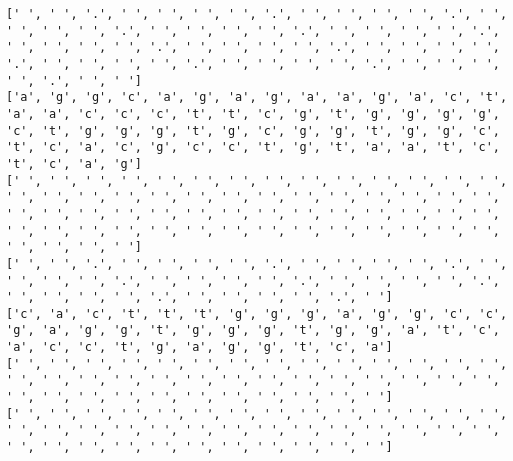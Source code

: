 \documentclass{article}
\begin{document}
\begin{Verbatim}
[' ', ' ', '.', ' ', ' ', ' ', ' ', '.', ' ', ' ', ' ', ' ', '.', ' ', ' ', ' ', ' ', '.', ' ', ' ', ' ', ' ', '.', ' ', ' ', ' ', ' ', '.', ' ', ' ', ' ', ' ', '.', ' ', ' ', ' ', ' ', '.', ' ', ' ', ' ', ' ', '.', ' ', ' ', ' ', ' ', '.', ' ', ' ', ' ', ' ', '.', ' ', ' ', ' ', ' ', '.', ' ', ' ']
['a', 'g', 'g', 'c', 'a', 'g', 'a', 'g', 'a', 'a', 'g', 'a', 'c', 't', 'a', 'a', 'c', 'c', 'c', 't', 't', 'c', 'g', 't', 'g', 'g', 'g', 'g', 'c', 't', 'g', 'g', 'g', 't', 'g', 'c', 'g', 'g', 't', 'g', 'g', 'c', 't', 'c', 'a', 'c', 'g', 'c', 'c', 't', 'g', 't', 'a', 'a', 't', 'c', 't', 'c', 'a', 'g']
[' ', ' ', ' ', ' ', ' ', ' ', ' ', ' ', ' ', ' ', ' ', ' ', ' ', ' ', ' ', ' ', ' ', ' ', ' ', ' ', ' ', ' ', ' ', ' ', ' ', ' ', ' ', ' ', ' ', ' ', ' ', ' ', ' ', ' ', ' ', ' ', ' ', ' ', ' ', ' ', ' ', ' ', ' ', ' ', ' ', ' ', ' ', ' ', ' ', ' ', ' ', ' ', ' ', ' ', ' ', ' ', ' ', ' ', ' ', ' ']
[' ', ' ', '.', ' ', ' ', ' ', ' ', '.', ' ', ' ', ' ', ' ', '.', ' ', ' ', ' ', ' ', '.', ' ', ' ', ' ', ' ', '.', ' ', ' ', ' ', ' ', '.', ' ', ' ', ' ', ' ', '.', ' ', ' ', ' ', ' ', '.', ' ']
['c', 'a', 'c', 't', 't', 't', 'g', 'g', 'g', 'a', 'g', 'g', 'c', 'c', 'g', 'a', 'g', 'g', 't', 'g', 'g', 'g', 't', 'g', 'g', 'a', 't', 'c', 'a', 'c', 'c', 't', 'g', 'a', 'g', 'g', 't', 'c', 'a']
[' ', ' ', ' ', ' ', ' ', ' ', ' ', ' ', ' ', ' ', ' ', ' ', ' ', ' ', ' ', ' ', ' ', ' ', ' ', ' ', ' ', ' ', ' ', ' ', ' ', ' ', ' ', ' ', ' ', ' ', ' ', ' ', ' ', ' ', ' ', ' ', ' ', ' ', ' ']
[' ', ' ', ' ', ' ', ' ', ' ', ' ', ' ', ' ', ' ', ' ', ' ', ' ', ' ', ' ', ' ', ' ', ' ', ' ', ' ', ' ', ' ', ' ', ' ', ' ', ' ', ' ', ' ', ' ', ' ', ' ', ' ', ' ', ' ', ' ', ' ', ' ', ' ', ' ']
 

\end{Verbatim}
\end{document}
